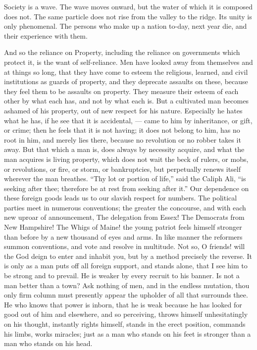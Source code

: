 \documentclass[12pt]{article}
\begin{document}
Society is a wave. The wave moves onward, but the water of which it is
composed does not. The same particle does not rise from the valley to the
ridge. Its unity is only phenomenal. The persons who make up a nation
to-day, next year die, and their experience with them.

And so the reliance on Property, including the reliance on governments which
protect it, is the want of self-reliance. Men have looked away from
themselves and at things so long, that they have come to esteem the
religious, learned, and civil institutions as guards of property, and they
deprecate assaults on these, because they feel them to be assaults on
property. They measure their esteem of each other by what each has, and not
by what each is. But a cultivated man becomes ashamed of his property, out
of new respect for his nature. Especially he hates what he has, if he see
that it is accidental, --- came to him by inheritance, or gift, or crime;
then he feels that it is not having; it does not belong to him, has no root
in him, and merely lies there, because no revolution or no robber takes it
away. But that which a man is, does always by necessity acquire, and what the
man acquires is living property, which does not wait the beck of rulers, or
mobs, or revolutions, or fire, or storm, or bankruptcies, but perpetually
renews itself wherever the man breathes. ``Thy lot or portion of life,'' said
the Caliph Ali, ``is seeking after thee; therefore be at rest from seeking
after it.'' Our dependence on these foreign goods leads us to our slavish
respect for numbers. The political parties meet in numerous conventions; the
greater the concourse, and with each new uproar of announcement, The
delegation from Essex! The Democrats from New Hampshire! The Whigs of Maine!
the young patriot feels himself stronger than before by a new thousand of
eyes and arms. In like manner the reformers summon conventions, and vote and
resolve in multitude. Not so, O friends! will the God deign to enter and
inhabit you, but by a method precisely the reverse. It is only as a man puts
off all foreign support, and stands alone, that I see him to be strong and
to prevail. He is weaker by every recruit to his banner. Is not a man better
than a town? Ask nothing of men, and in the endless mutation, thou only firm
column must presently appear the upholder of all that surrounds thee. He who
knows that power is inborn, that he is weak because he has looked for good
out of him and elsewhere, and so perceiving, throws himself unhesitatingly
on his thought, instantly rights himself, stands in the erect position,
commands his limbs, works miracles; just as a man who stands on his feet is
stronger than a man who stands on his head.
\end{document}
